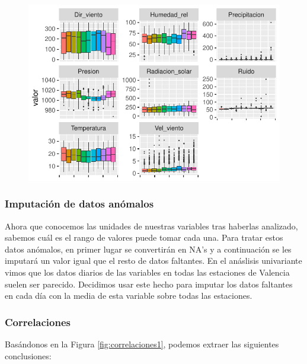 \documentclass[notspecified,article,submit,moreauthors,pdftex]{Definitions/mdpi}
\begin{document}
\begin{figure}

\includegraphics[width=0.7\linewidth]{ProyectoAED2023_files/figure-latex/boxplot_anos2-1} \hfill{}

\caption{\label{fig:boxplot_anos2}}\label{fig:boxplot_anos2}
\end{figure}

\hypertarget{imputaciuxf3n-de-datos-anuxf3malos}{%
\subsubsection{Imputación de datos
anómalos}\label{imputaciuxf3n-de-datos-anuxf3malos}}

Ahora que conocemos las unidades de nuestras variables tras haberlas
analizado, sabemos cuál es el rango de valores puede tomar cada una.
Para tratar estos datos anómalos, en primer lugar se convertirán en NA's
y a continuación se les imputará un valor igual que el resto de datos
faltantes. En el anáslisis univariante vimos que los datos diarios de
las variables en todas las estaciones de Valencia suelen ser parecido.
Decidimos usar este hecho para imputar los datos faltantes en cada día
con la media de esta variable sobre todas las estaciones.

\hypertarget{correlaciones}{%
\subsubsection{Correlaciones}\label{correlaciones}}

Basándonos en la Figura \ref{fig:correlaciones1}, podemos extraer las
siguientes conclusiones:
\end{document}
